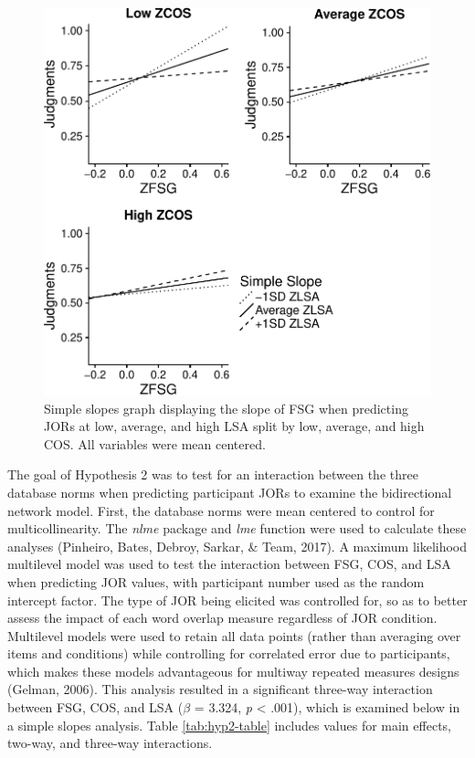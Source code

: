\documentclass[english,man]{apa6}
\theoremstyle{definition}
\theoremstyle{definition}
\theoremstyle{definition}
\theoremstyle{remark}
\begin{document}
\begin{figure}
\centering
\includegraphics{max_buch_JOL_files/figure-latex/hyp2graph-1.pdf}
\caption{\label{fig:hyp2graph}Simple slopes graph displaying the slope of
FSG when predicting JORs at low, average, and high LSA split by low,
average, and high COS. All variables were mean centered.}
\end{figure}

The goal of Hypothesis 2 was to test for an interaction between the
three database norms when predicting participant JORs to examine the
bidirectional network model. First, the database norms were mean
centered to control for multicollinearity. The \emph{nlme} package and
\emph{lme} function were used to calculate these analyses (Pinheiro,
Bates, Debroy, Sarkar, \& Team, 2017). A maximum likelihood multilevel
model was used to test the interaction between FSG, COS, and LSA when
predicting JOR values, with participant number used as the random
intercept factor. The type of JOR being elicited was controlled for, so
as to better assess the impact of each word overlap measure regardless
of JOR condition. Multilevel models were used to retain all data points
(rather than averaging over items and conditions) while controlling for
correlated error due to participants, which makes these models
advantageous for multiway repeated measures designs (Gelman, 2006). This
analysis resulted in a significant three-way interaction between FSG,
COS, and LSA (\(\beta\) = 3.324, \emph{p} \textless{} .001), which is
examined below in a simple slopes analysis. Table \ref{tab:hyp2-table}
includes values for main effects, two-way, and three-way interactions.
\end{document}
